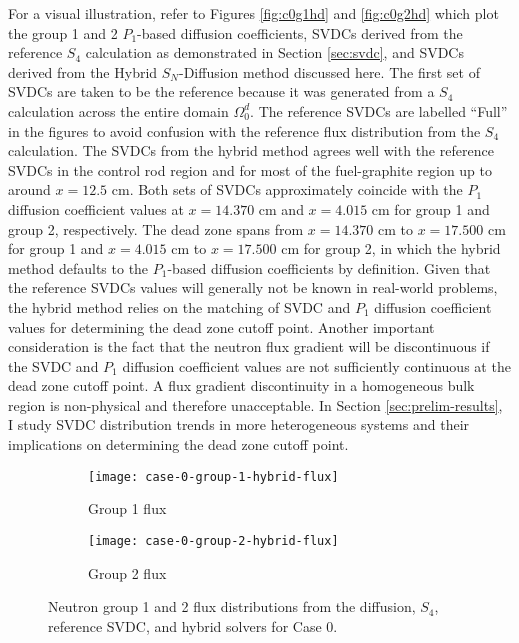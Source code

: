 For a visual illustration, refer to Figures \ref{fig:c0g1hd} and \ref{fig:c0g2hd} which plot the
group 1 and 2 $P_1$-based diffusion coefficients, \glspl{SVDC} derived from the reference $S_4$
calculation as demonstrated in Section \ref{sec:svdc}, and \glspl{SVDC} derived from the Hybrid
$S_N$-Diffusion method discussed here. The first set of \glspl{SVDC} are taken to be the reference
because it was generated from a $S_4$ calculation across the entire domain $\Omega^d_0$. The
reference \glspl{SVDC} are labelled ``Full'' in the figures to avoid confusion with the reference
flux distribution from the $S_4$ calculation. The \glspl{SVDC} from the hybrid method agrees well
with the reference \glspl{SVDC} in the control rod region and for most of the fuel-graphite region
up to around $x=12.5$ cm. Both sets of \glspl{SVDC} approximately coincide with the $P_1$ diffusion
coefficient values at $x=14.370$ cm and $x=4.015$ cm for group 1 and group 2, respectively. The
dead zone spans from $x=14.370$ cm to $x=17.500$ cm for group 1 and $x=4.015$ cm to $x=17.500$ cm
for group 2, in which the hybrid method defaults to the $P_1$-based diffusion coefficients by
definition. Given that the reference \glspl{SVDC} values will generally not be known in real-world
problems, the hybrid method relies on the matching of \gls{SVDC} and $P_1$ diffusion coefficient
values for determining the dead zone cutoff point. Another important consideration is the fact that
the neutron flux gradient will be discontinuous if the \gls{SVDC} and $P_1$ diffusion coefficient
values are not sufficiently continuous at the dead zone cutoff point. A flux gradient discontinuity
in a homogeneous bulk region is non-physical and therefore unacceptable. In Section
\ref{sec:prelim-results}, I study \gls{SVDC} distribution trends in more heterogeneous systems and
their implications on determining the dead zone cutoff point.
%
\begin{figure}[htb!]
  \centering
  \begin{subfigure}[b]{.49\textwidth}
    \centering
    \texttt{[image: case-0-group-1-hybrid-flux]}
    \caption{Group 1 flux}
    \label{fig:c0g1hf}
  \end{subfigure}
  \hfill
  \begin{subfigure}[b]{.49\textwidth}
    \centering
    \texttt{[image: case-0-group-2-hybrid-flux]}
    \caption{Group 2 flux}
    \label{fig:c0g2hf}
  \end{subfigure}
  \caption{Neutron group 1 and 2 flux distributions from the diffusion, $S_4$, reference
  \gls{SVDC}, and hybrid solvers for Case 0.}
  \label{fig:c0hf}
\end{figure}

